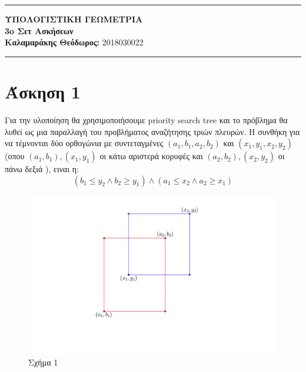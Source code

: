 \documentclass[12pt]{article}
\begin{document}
\greektext

\noindent\rule{\textwidth}{2pt}
\begin{center}
{\bf ΥΠΟΛΟΓΙΣΤΙΚΗ ΓΕΩΜΕΤΡΙΑ}\\ 
{\bf 3o Σετ Ασκήσεων }\\
{\bf Καλαμαράκης Θεόδωρος:} 2018030022\\
\end{center}
\rule{\textwidth}{.5pt}
\noindent

\begin{center}

\end{center}
 
 

\justifying

\section*{Άσκηση 1}
    Για την υλοποίηση θα χρησιμοποιήσουμε \textlatin{priority search tree} και το πρόβλημα θα λυθεί ως μια παραλλαγή του προβλήματος αναζήτησης τριών πλευρών. Η συνθήκη για να τέμνονται δύο ορθογώνια με συντεταγμένες $(a_1,b_1,a_2,b_2)$ και $(x_1,y_1,x_2,y_2)$ 
    (οπου $(a_1,b_1),(x_1,y_1)$ οι κάτω αριστερά κορυφές και $(a_2,b_2),(x_2,y_2)$ οι πάνω δεξιά ), ειναι η:
    $$\left(b_1\leq y_2 \land b_2 \geq y_1\right) \land \left(a_1\leq x_2 \land a_2 \geq x_1\right)$$
    \begin{figure}[H]
        \centering
        \includegraphics[scale = 0.7]{geogebra-export.png}
        \caption*{Σχήμα 1}
    \end{figure}
\end{document}
